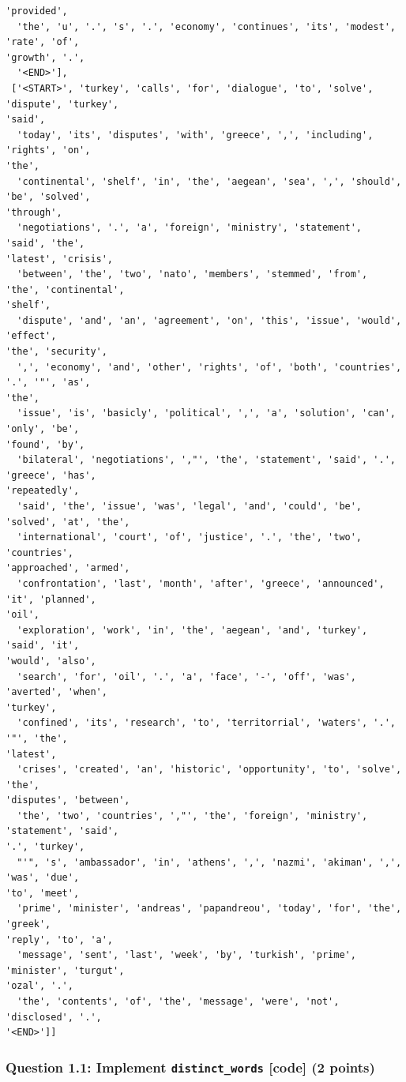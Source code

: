 \documentclass[11pt]{article}
\begin{document}
\begin{Verbatim}[commandchars=\\\{\},fontsize=\footnotesize]
'provided',
  'the', 'u', '.', 's', '.', 'economy', 'continues', 'its', 'modest', 'rate', 'of',
'growth', '.',
  '<END>'],
 ['<START>', 'turkey', 'calls', 'for', 'dialogue', 'to', 'solve', 'dispute', 'turkey',
'said',
  'today', 'its', 'disputes', 'with', 'greece', ',', 'including', 'rights', 'on',
'the',
  'continental', 'shelf', 'in', 'the', 'aegean', 'sea', ',', 'should', 'be', 'solved',
'through',
  'negotiations', '.', 'a', 'foreign', 'ministry', 'statement', 'said', 'the',
'latest', 'crisis',
  'between', 'the', 'two', 'nato', 'members', 'stemmed', 'from', 'the', 'continental',
'shelf',
  'dispute', 'and', 'an', 'agreement', 'on', 'this', 'issue', 'would', 'effect',
'the', 'security',
  ',', 'economy', 'and', 'other', 'rights', 'of', 'both', 'countries', '.', '"', 'as',
'the',
  'issue', 'is', 'basicly', 'political', ',', 'a', 'solution', 'can', 'only', 'be',
'found', 'by',
  'bilateral', 'negotiations', ',"', 'the', 'statement', 'said', '.', 'greece', 'has',
'repeatedly',
  'said', 'the', 'issue', 'was', 'legal', 'and', 'could', 'be', 'solved', 'at', 'the',
  'international', 'court', 'of', 'justice', '.', 'the', 'two', 'countries',
'approached', 'armed',
  'confrontation', 'last', 'month', 'after', 'greece', 'announced', 'it', 'planned',
'oil',
  'exploration', 'work', 'in', 'the', 'aegean', 'and', 'turkey', 'said', 'it',
'would', 'also',
  'search', 'for', 'oil', '.', 'a', 'face', '-', 'off', 'was', 'averted', 'when',
'turkey',
  'confined', 'its', 'research', 'to', 'territorrial', 'waters', '.', '"', 'the',
'latest',
  'crises', 'created', 'an', 'historic', 'opportunity', 'to', 'solve', 'the',
'disputes', 'between',
  'the', 'two', 'countries', ',"', 'the', 'foreign', 'ministry', 'statement', 'said',
'.', 'turkey',
  "'", 's', 'ambassador', 'in', 'athens', ',', 'nazmi', 'akiman', ',', 'was', 'due',
'to', 'meet',
  'prime', 'minister', 'andreas', 'papandreou', 'today', 'for', 'the', 'greek',
'reply', 'to', 'a',
  'message', 'sent', 'last', 'week', 'by', 'turkish', 'prime', 'minister', 'turgut',
'ozal', '.',
  'the', 'contents', 'of', 'the', 'message', 'were', 'not', 'disclosed', '.',
'<END>']]

    \end{Verbatim}

    \subsubsection{\texorpdfstring{Question 1.1: Implement
\texttt{distinct\_words} {[}code{]} (2
points)}{Question 1.1: Implement distinct\_words {[}code{]} (2 points)}}\label{question-1.1-implement-distinct_words-code-2-points}
\end{document}
